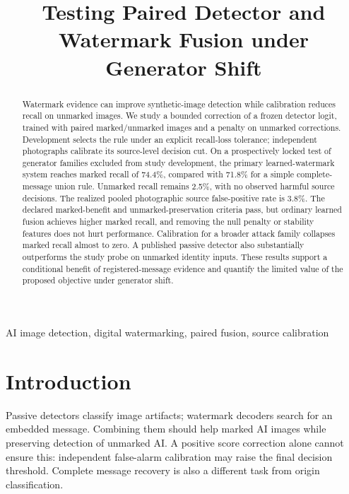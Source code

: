 \documentclass[conference]{IEEEtran}
\title{Testing Paired Detector and Watermark Fusion under Generator Shift}
\author{\IEEEauthorblockN{Anonymous Authors}}
\begin{document}
\maketitle
\begin{abstract}
Watermark evidence can improve synthetic-image detection while calibration
reduces recall on unmarked images. We study a bounded correction of a frozen
detector logit, trained with paired marked/unmarked images and a penalty on
unmarked corrections. Development selects the rule under an explicit recall-loss
tolerance; independent photographs calibrate its source-level decision cut.
On a prospectively locked test of generator families excluded from study
development, the primary learned-watermark system reaches marked recall of
74.4\%, compared with 71.8\% for a simple complete-message union rule.
Unmarked recall remains 2.5\%, with no observed harmful source decisions.
The realized pooled photographic source false-positive rate is 3.8\%.
The declared marked-benefit and unmarked-preservation criteria pass, but ordinary
learned fusion achieves higher marked recall, and removing the null penalty
or stability features does not hurt performance. Calibration for a broader
attack family collapses marked recall almost to zero. A published passive detector
also substantially outperforms the study probe on unmarked identity inputs. These results
support a conditional benefit of registered-message evidence and quantify the
limited value of the proposed objective under generator shift.
\end{abstract}
\begin{IEEEkeywords}
AI image detection, digital watermarking, paired fusion, source calibration
\end{IEEEkeywords}

\section{Introduction}
Passive detectors classify image artifacts; watermark decoders search for an
embedded message. Combining them should help marked AI images while preserving
detection of unmarked AI. A positive score correction alone cannot ensure this:
independent false-alarm calibration may raise the final decision threshold.
Complete message recovery is also a different task from origin classification.
\end{document}
